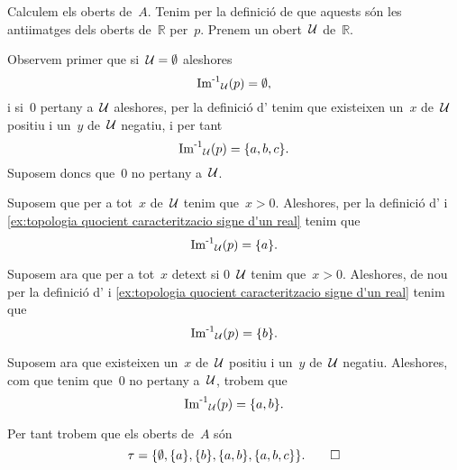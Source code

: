 \documentclass[../../main.tex]{subfiles}
\begin{document}
    \begin{solution}
        Calculem els oberts de~\(A\).
        Tenim per la definició de  que aquests són les antiimatges dels oberts de~\(\mathbb{R}\) per~\(p\).
        Prenem un obert~\(\mathcal{U}\) de~\(\mathbb{R}\).

        Observem primer que si~\(\mathcal{U}=\emptyset\) aleshores
        \[
            \operatorname{\operatorname{Im}^{-1}}_{\mathcal{U}}(p)=\emptyset,
        \]
        i si~\(0\) pertany a~\(\mathcal{U}\) aleshores, per la definició d' tenim que existeixen un~\(x\) de~\(\mathcal{U}\) positiu i un~\(y\) de~\(\mathcal{U}\) negatiu, i per tant
        \[
            \operatorname{\operatorname{Im}^{-1}}_{\mathcal{U}}(p)=\{a,b,c\}.
        \]
        Suposem doncs que~\(0\) no pertany a~\(\mathcal{U}\).

        Suposem que per a tot~\(x\) de~\(\mathcal{U}\) tenim que~\(x>0\).
        Aleshores, per la definició d' i \eqref{ex:topologia quocient caracteritzacio signe d'un real} tenim que
        \[
            \operatorname{\operatorname{Im}^{-1}}_{\mathcal{U}}(p)=\{a\}.
        \]

        Suposem ara que per a tot~\(x\) detext{ si }0~\(\mathcal{U}\) tenim que~\(x>0\).
        Aleshores, de nou per la definició d' i \eqref{ex:topologia quocient caracteritzacio signe d'un real} tenim que
        \[
            \operatorname{\operatorname{Im}^{-1}}_{\mathcal{U}}(p)=\{b\}.
        \]

        Suposem ara que existeixen un~\(x\) de~\(\mathcal{U}\) positiu i un~\(y\) de~\(\mathcal{U}\) negatiu.
        Aleshores, com que tenim que~\(0\) no pertany a~\(\mathcal{U}\), trobem que
        \[
            \operatorname{\operatorname{Im}^{-1}}_{\mathcal{U}}(p)=\{a,b\}.
        \]

        Per tant trobem que els oberts de~\(A\) són
        \[
            \tau=\{\emptyset,\{a\},\{b\},\{a,b\},\{a,b,c\}\}.\qedhere
        \]
    \end{solution}
\end{document}
